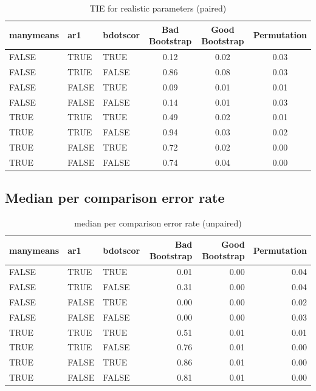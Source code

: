 \documentclass{article}
\begin{document}
\begin{table}[H]
\centering
\begin{tabular}{lllccc}
  \hline
  manymeans & ar1 & bdotscor &  Bad Bootstrap & Good Bootstrap & Permutation \\ 
  \hline
FALSE & TRUE & TRUE & 0.12 & 0.02 & 0.03 \\ 
  FALSE & TRUE & FALSE & 0.86 & 0.08 & 0.03 \\ 
  FALSE & FALSE & TRUE & 0.09 & 0.01 & 0.01 \\ 
  FALSE & FALSE & FALSE & 0.14 & 0.01 & 0.03 \\ 
  TRUE & TRUE & TRUE & 0.49 & 0.02 & 0.01 \\ 
  TRUE & TRUE & FALSE & 0.94 & 0.03 & 0.02 \\ 
  TRUE & FALSE & TRUE & 0.72 & 0.02 & 0.00 \\ 
  TRUE & FALSE & FALSE & 0.74 & 0.04 & 0.00 \\ 
   \hline
\end{tabular}
\caption{TIE for realistic parameters (paired)}
\end{table}

\subsection{Median per comparison error rate}

\begin{table}[H]
\centering
\begin{tabular}{lllrrr}
  \hline
  manymeans & ar1 & bdotscor &  Bad Bootstrap & Good Bootstrap & Permutation  \\ 
  \hline
FALSE & TRUE & TRUE & 0.01 & 0.00 & 0.04 \\ 
  FALSE & TRUE & FALSE & 0.31 & 0.00 & 0.04 \\ 
  FALSE & FALSE & TRUE & 0.00 & 0.00 & 0.02 \\ 
  FALSE & FALSE & FALSE & 0.00 & 0.00 & 0.03 \\ 
  TRUE & TRUE & TRUE & 0.51 & 0.01 & 0.01 \\ 
  TRUE & TRUE & FALSE & 0.76 & 0.01 & 0.00 \\ 
  TRUE & FALSE & TRUE & 0.86 & 0.01 & 0.00 \\ 
  TRUE & FALSE & FALSE & 0.81 & 0.01 & 0.00 \\ 
   \hline
\end{tabular}
\caption{median per comparison error rate (unpaired)}
\end{table}
\end{document}
